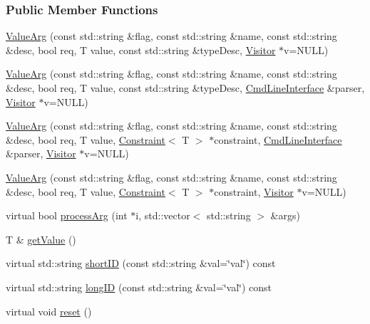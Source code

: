 \subsubsection*{Public Member Functions}
\begin{DoxyCompactItemize}
\item 
\hyperlink{classTCLAP_1_1ValueArg_ab2818435a1749bee3233b1f364dabf09}{Value\+Arg} (const std\+::string \&flag, const std\+::string \&name, const std\+::string \&desc, bool req, T value, const std\+::string \&type\+Desc, \hyperlink{classTCLAP_1_1Visitor}{Visitor} $\ast$v=N\+U\+LL)
\item 
\hyperlink{classTCLAP_1_1ValueArg_a3b34856ee6613ccabe60d2c5a6cc714f}{Value\+Arg} (const std\+::string \&flag, const std\+::string \&name, const std\+::string \&desc, bool req, T value, const std\+::string \&type\+Desc, \hyperlink{classTCLAP_1_1CmdLineInterface}{Cmd\+Line\+Interface} \&parser, \hyperlink{classTCLAP_1_1Visitor}{Visitor} $\ast$v=N\+U\+LL)
\item 
\hyperlink{classTCLAP_1_1ValueArg_aa054e7649b5d9db4861eed344a8f5840}{Value\+Arg} (const std\+::string \&flag, const std\+::string \&name, const std\+::string \&desc, bool req, T value, \hyperlink{classTCLAP_1_1Constraint}{Constraint}$<$ T $>$ $\ast$constraint, \hyperlink{classTCLAP_1_1CmdLineInterface}{Cmd\+Line\+Interface} \&parser, \hyperlink{classTCLAP_1_1Visitor}{Visitor} $\ast$v=N\+U\+LL)
\item 
\hyperlink{classTCLAP_1_1ValueArg_a152c816b8bdb19efada14e8aec9bd05c}{Value\+Arg} (const std\+::string \&flag, const std\+::string \&name, const std\+::string \&desc, bool req, T value, \hyperlink{classTCLAP_1_1Constraint}{Constraint}$<$ T $>$ $\ast$constraint, \hyperlink{classTCLAP_1_1Visitor}{Visitor} $\ast$v=N\+U\+LL)
\item 
virtual bool \hyperlink{classTCLAP_1_1ValueArg_a71e6ee7c7324724b6fc067c5ffe31160}{process\+Arg} (int $\ast$i, std\+::vector$<$ std\+::string $>$ \&args)
\item 
T \& \hyperlink{classTCLAP_1_1ValueArg_a46900b79f4549a37003120be284adfee}{get\+Value} ()
\item 
virtual std\+::string \hyperlink{classTCLAP_1_1ValueArg_abb1eb22814d0a0da49c5f8bb57362d09}{short\+ID} (const std\+::string \&val=\char`\"{}val\char`\"{}) const 
\item 
virtual std\+::string \hyperlink{classTCLAP_1_1ValueArg_a586d25c04c39ddf0e589605d79f72f8a}{long\+ID} (const std\+::string \&val=\char`\"{}val\char`\"{}) const 
\item 
virtual void \hyperlink{classTCLAP_1_1ValueArg_a1bc480b71c4d8ac3646e796af8fb6e14}{reset} ()
\end{DoxyCompactItemize}
